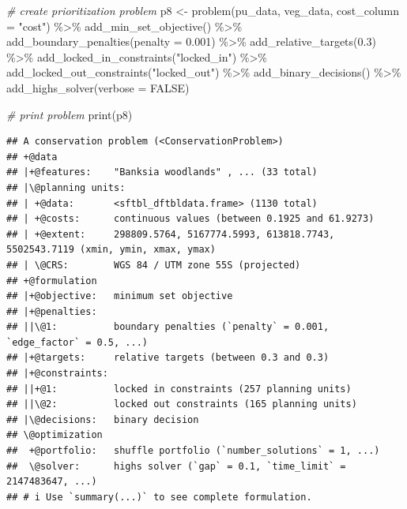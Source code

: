 \documentclass[
  12pt,
]{book}
\newenvironment{Shaded}{\begin{snugshade}}{\end{snugshade}}
\newcommand{\AttributeTok}[1]{\textcolor[rgb]{0.77,0.63,0.00}{#1}}
\newcommand{\CommentTok}[1]{\textcolor[rgb]{0.56,0.35,0.01}{\textit{#1}}}
\newcommand{\ConstantTok}[1]{\textcolor[rgb]{0.00,0.00,0.00}{#1}}
\newcommand{\FloatTok}[1]{\textcolor[rgb]{0.00,0.00,0.81}{#1}}
\newcommand{\FunctionTok}[1]{\textcolor[rgb]{0.00,0.00,0.00}{#1}}
\newcommand{\NormalTok}[1]{#1}
\newcommand{\OtherTok}[1]{\textcolor[rgb]{0.56,0.35,0.01}{#1}}
\newcommand{\SpecialCharTok}[1]{\textcolor[rgb]{0.00,0.00,0.00}{#1}}
\newcommand{\StringTok}[1]{\textcolor[rgb]{0.31,0.60,0.02}{#1}}
\begin{document}
\begin{Shaded}
\begin{Highlighting}[]
\CommentTok{\# create prioritization problem}
\NormalTok{p8 }\OtherTok{\textless{}{-}}
  \FunctionTok{problem}\NormalTok{(pu\_data, veg\_data, }\AttributeTok{cost\_column =} \StringTok{"cost"}\NormalTok{) }\SpecialCharTok{\%\textgreater{}\%}
  \FunctionTok{add\_min\_set\_objective}\NormalTok{() }\SpecialCharTok{\%\textgreater{}\%}
  \FunctionTok{add\_boundary\_penalties}\NormalTok{(}\AttributeTok{penalty =} \FloatTok{0.001}\NormalTok{) }\SpecialCharTok{\%\textgreater{}\%}
  \FunctionTok{add\_relative\_targets}\NormalTok{(}\FloatTok{0.3}\NormalTok{) }\SpecialCharTok{\%\textgreater{}\%}
  \FunctionTok{add\_locked\_in\_constraints}\NormalTok{(}\StringTok{"locked\_in"}\NormalTok{) }\SpecialCharTok{\%\textgreater{}\%}
  \FunctionTok{add\_locked\_out\_constraints}\NormalTok{(}\StringTok{"locked\_out"}\NormalTok{) }\SpecialCharTok{\%\textgreater{}\%}
  \FunctionTok{add\_binary\_decisions}\NormalTok{() }\SpecialCharTok{\%\textgreater{}\%}
  \FunctionTok{add\_highs\_solver}\NormalTok{(}\AttributeTok{verbose =} \ConstantTok{FALSE}\NormalTok{)}

\CommentTok{\# print problem}
\FunctionTok{print}\NormalTok{(p8)}
\end{Highlighting}
\end{Shaded}

\begin{verbatim}
## A conservation problem (<ConservationProblem>)
## +@data
## |+@features:    "Banksia woodlands" , ... (33 total)
## |\@planning units:
## | +@data:       <sftbl_dftbldata.frame> (1130 total)
## | +@costs:      continuous values (between 0.1925 and 61.9273)
## | +@extent:     298809.5764, 5167774.5993, 613818.7743, 5502543.7119 (xmin, ymin, xmax, ymax)
## | \@CRS:        WGS 84 / UTM zone 55S (projected)
## +@formulation
## |+@objective:   minimum set objective
## |+@penalties:
## ||\@1:          boundary penalties (`penalty` = 0.001, `edge_factor` = 0.5, ...)
## |+@targets:     relative targets (between 0.3 and 0.3)
## |+@constraints:
## ||+@1:          locked in constraints (257 planning units)
## ||\@2:          locked out constraints (165 planning units)
## |\@decisions:   binary decision
## \@optimization
##  +@portfolio:   shuffle portfolio (`number_solutions` = 1, ...)
##  \@solver:      highs solver (`gap` = 0.1, `time_limit` = 2147483647, ...)
## # i Use `summary(...)` to see complete formulation.
\end{verbatim}
\end{document}
